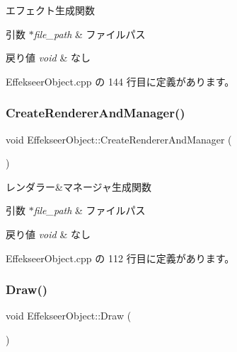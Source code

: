 エフェクト生成関数 


\begin{DoxyParams}{引数}
{\em $\ast$file\+\_\+path} & ファイルパス \\
\hline
\end{DoxyParams}

\begin{DoxyRetVals}{戻り値}
{\em void} & なし \\
\hline
\end{DoxyRetVals}


 Effekseer\+Object.\+cpp の 144 行目に定義があります。

\mbox{\label{class_effekseer_object_a6b7b077ec4d0892add6e0958dae833db}} 
\subsubsection{\texorpdfstring{Create\+Renderer\+And\+Manager()}{CreateRendererAndManager()}}
{\footnotesize\ttfamily void Effekseer\+Object\+::\+Create\+Renderer\+And\+Manager (\begin{DoxyParamCaption}{ }\end{DoxyParamCaption})\hspace{0.3cm}{\ttfamily [private]}}



レンダラー\&マネージャ生成関数 


\begin{DoxyParams}{引数}
{\em $\ast$file\+\_\+path} & ファイルパス \\
\hline
\end{DoxyParams}

\begin{DoxyRetVals}{戻り値}
{\em void} & なし \\
\hline
\end{DoxyRetVals}


 Effekseer\+Object.\+cpp の 112 行目に定義があります。

\mbox{\label{class_effekseer_object_adc628e5089ca0cdc418e92729943a3b2}} 
\subsubsection{\texorpdfstring{Draw()}{Draw()}}
{\footnotesize\ttfamily void Effekseer\+Object\+::\+Draw (\begin{DoxyParamCaption}{ }\end{DoxyParamCaption})}



